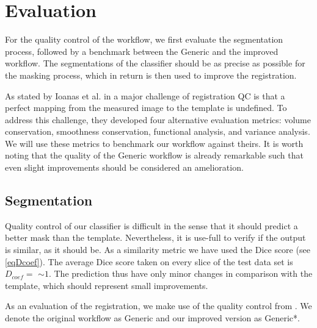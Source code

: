 \section{Evaluation}
For the quality control of the workflow, we first evaluate the segmentation process, followed by a benchmark between the Generic and the improved workflow.
The segmentations of the classifier should be as precise as possible for the masking process, which in return is then used to improve the registration.

As stated by Ioanas et al. in \cite{ioanas_optimized_2019} a major challenge of registration QC is that a perfect mapping from the measured image to the template is undefined.
To address this challenge, they developed four alternative evaluation metrics: volume conservation, smoothness conservation, functional analysis, and variance analysis.
We will use these metrics to benchmark our workflow against theirs.
It is worth noting that the quality of the Generic workflow is already remarkable such that even slight improvements should be considered an amelioration.

\subsection{Segmentation}
Quality control of our classifier is difficult in the sense that it should predict a better mask than the template.
Nevertheless, it is use-full to verify if the output is similar, as it should be.
As a similarity metric we have used the Dice score (see \cref{eqDcoef}).
The average Dice score taken on every slice of the test data set is $D_{coef}= $  $\sim 1$.
The prediction thus have only minor changes in comparison with the template, which should represent small improvements.


\begin{sansmath}
\end{sansmath}

As an evaluation of the registration, we make use of the quality control from \cite{ioanas_optimized_2019}.
We denote the original workflow as Generic and our improved version as Generic*.

